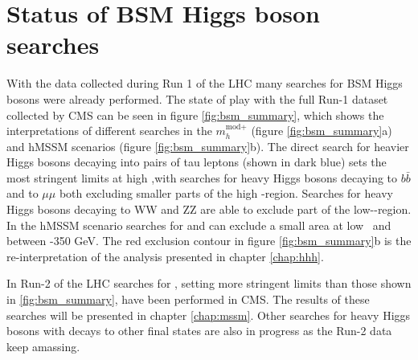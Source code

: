 \section{Status of BSM Higgs boson searches}
\label{sec:theory_BSMH_status}
With the data collected during 
Run 1 of the \ac{LHC} many searches for BSM Higgs
bosons were already performed. The state of play with the full
Run-1 dataset collected by \ac{CMS} can be seen in figure \ref{fig:bsm_summary},
which shows the interpretations of different searches in the $m_{h}^{\text{mod+}}$ (figure \ref{fig:bsm_summary}a)
and hMSSM scenarios (figure \ref{fig:bsm_summary}b). The direct search for heavier Higgs bosons decaying into pairs
of tau leptons (shown in dark blue) sets the most stringent limits at high \tanb,with searches for 
heavy Higgs bosons decaying to $b\bar{b}$ and to $\mu\mu$ both excluding smaller parts of the high \tanb-region.
Searches for heavy Higgs bosons decaying to WW and ZZ are able to exclude part of the low-\tanb-region. In the 
hMSSM scenario searches for \Htohh and \AtoZh can exclude a small area at low \tanb~and between -350 GeV.
The red exclusion contour in figure \ref{fig:bsm_summary}b is the re-interpretation of the analysis presented in
chapter \ref{chap:hhh}.

In Run-2 of the \ac{LHC} searches for \AHtotautau, setting more stringent limits than those shown in \ref{fig:bsm_summary},
have been performed in \ac{CMS}. The results of these searches will be presented in chapter \ref{chap:mssm}. Other searches
for heavy Higgs bosons with decays to other final states are also in progress as the Run-2 data keep
amassing. 

